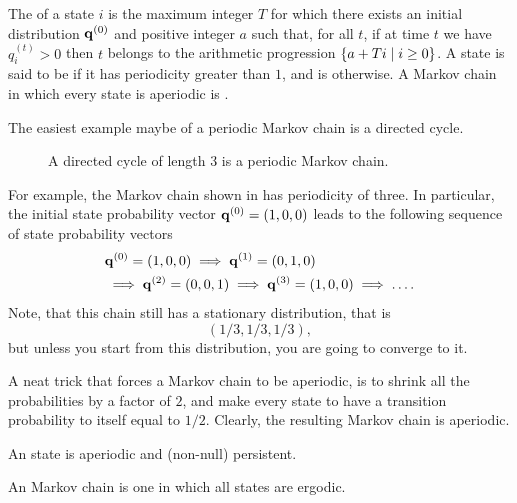 \begin{defn}
    The  of a state $i$ is the maximum integer $T$
    for which there exists an initial distribution $\mathbf{q}^{(0)}$ and
    positive integer $a$ such that, for all $t$, if at time $t$ we
    have $q_i^{(t)} >0$ then $t$ belongs to the arithmetic progression
    $\left\{ a+ T i  \;\middle\vert\;  i \geq 0 \right\}$. A state is said to be
     if it has periodicity greater
    than $1$, and is  otherwise. A
    Markov chain in which every state is aperiodic is
    .
\end{defn}

\begin{example}
    The easiest example maybe of a periodic Markov chain is a directed
    cycle. 

    \begin{figure}[t]
        \centering
        \caption{A directed cycle of length 3 is a periodic Markov chain.}
    \end{figure}

    For example, the Markov chain shown in  has periodicity of
    three. In particular, the initial state probability vector
    $\mathbf{q}^{(0)} = (1,0,0)$ leads to the following sequence of state
    probability vectors
    \begin{align*}
        &\MCPVec{0} = (1,0,0)%
        \implies%
        \MCPVec{1} = (0,1,0)%
        \\&\implies%
        \MCPVec{2} = (0,0,1)%
        \implies%
        \MCPVec{3} = (1,0,0) %
        \implies \ldots.%
    \end{align*}
    Note, that this chain still has a stationary distribution, that is
    \[
    (1/3, 1/3, 1/3),
    \]
    but unless you start from this distribution,
    you are going to converge to it.
\end{example}


A neat trick that forces a Markov chain to be aperiodic, is to shrink
all the probabilities by a factor of $2$, and make every state to have
a transition probability to itself equal to $1/2$. Clearly, the
resulting Markov chain is aperiodic.


\begin{defn}
    An  state is aperiodic and
    (non-null) persistent.
    
    An  Markov chain is one in
    which all states are ergodic.
\end{defn}

